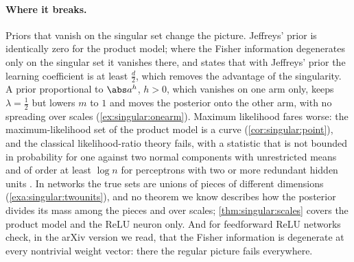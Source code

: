\begin{refsection}
\paragraph{Where it breaks.} Priors that vanish on the singular set change the picture. Jeffreys' prior is identically zero for the product model; where the Fisher information degenerates only on the singular set it vanishes there, and \textcite{Watanabe2024} states that with Jeffreys' prior the learning coefficient is at least $\frac d2$, which removes the advantage of the singularity. A prior proportional to $\abs a^h$, $h>0$, which vanishes on one arm only, keeps $\lambda=\frac12$ but lowers $m$ to $1$ and moves the posterior onto the other arm, with no spreading over scales (\cref{ex:singular:onearm}). Maximum likelihood fares worse: the maximum-likelihood set of the product model is a curve (\cref{cor:singular:point}), and the classical likelihood-ratio theory fails, with a statistic that is not bounded in probability for one against two normal components with unrestricted means \parencite[as later accounts state it]{Hartigan1985} and of order at least $\log n$ for perceptrons with two or more redundant hidden units \parencite[from the abstract]{Fukumizu2003}. In networks the true sets are unions of pieces of different dimensions (\cref{exa:singular:twounits}), and no theorem we know describes how the posterior divides its mass among the pieces and over scales; \cref{thm:singular:scales} covers the product model and the ReLU neuron only. And for feedforward ReLU networks \textcite{WeiEtAl2023} check, in the arXiv version we read, that the Fisher information is degenerate at every nontrivial weight vector: there the regular picture fails everywhere.


\end{refsection}
